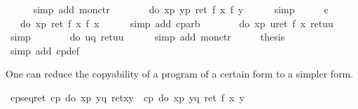 \begin{isabellebody}
\ \ \ \ \isamarkupfalse%
\ {\isacharparenleft}simp\ add{\isacharcolon}\ mon{\isacharunderscore}ctr{\isacharparenright}\isanewline
\ \ \isamarkupfalse%
\ \isamarkupfalse%
\ {\isachardoublequote}{\isasymdots}\ {\isacharequal}\ do\ {\isacharbraceleft}x{\isasymleftarrow}p{\isacharsemicolon}\ y{\isasymleftarrow}p{\isacharsemicolon}\ ret\ {\isacharparenleft}f\ x{\isacharcomma}\ f\ y{\isacharparenright}{\isacharbraceright}{\isachardoublequote}\isanewline
\ \ \ \ \isamarkupfalse%
\ simp\isanewline
\ \ \isamarkupfalse%
\ \isamarkupfalse%
\ c\ \ \isamarkupfalse%
\ {\isachardoublequote}{\isasymdots}\ {\isacharequal}\ do\ {\isacharbraceleft}x{\isasymleftarrow}p{\isacharsemicolon}\ ret\ {\isacharparenleft}f\ x{\isacharcomma}\ f\ x{\isacharparenright}{\isacharbraceright}{\isachardoublequote}\isanewline
\ \ \ \ \isamarkupfalse%
\ {\isacharparenleft}simp\ add{\isacharcolon}\ cp{\isacharunderscore}arb{\isacharparenright}\isanewline
\ \ \isamarkupfalse%
\ \isamarkupfalse%
\ {\isachardoublequote}{\isasymdots}\ {\isacharequal}\ do\ {\isacharbraceleft}x{\isasymleftarrow}p{\isacharsemicolon}\ u{\isasymleftarrow}ret\ {\isacharparenleft}f\ x{\isacharparenright}{\isacharsemicolon}\ ret{\isacharparenleft}u{\isacharcomma}u{\isacharparenright}{\isacharbraceright}{\isachardoublequote}\isanewline
\ \ \ \ \isamarkupfalse%
\ simp\isanewline
\ \ \isamarkupfalse%
\ \isamarkupfalse%
\ {\isachardoublequote}{\isasymdots}\ {\isacharequal}\ do\ {\isacharbraceleft}u{\isasymleftarrow}{\isacharquery}q{\isacharsemicolon}\ ret{\isacharparenleft}u{\isacharcomma}u{\isacharparenright}{\isacharbraceright}{\isachardoublequote}\isanewline
\ \ \ \ \isamarkupfalse%
\ {\isacharparenleft}simp\ add{\isacharcolon}\ mon{\isacharunderscore}ctr{\isacharparenright}\isanewline
\ \ \isamarkupfalse%
\ \isamarkupfalse%
\ {\isacharquery}thesis\ \isamarkupfalse%
\ {\isacharparenleft}simp\ add{\isacharcolon}\ cp{\isacharunderscore}def{\isacharparenright}\isanewline
\isamarkupfalse%
\isamarkupfalse%
%
\begin{isamarkuptext}%
One can reduce the copyability of a program of a certain form to a simpler
  form.%
\end{isamarkuptext}%
\isamarkuptrue%
\ cp{\isacharunderscore}seq{\isacharunderscore}ret{\isacharcolon}\ {\isachardoublequote}cp\ {\isacharparenleft}do\ {\isacharbraceleft}x{\isasymleftarrow}p{\isacharsemicolon}\ y{\isasymleftarrow}q{\isacharsemicolon}\ ret{\isacharparenleft}x{\isacharcomma}y{\isacharparenright}{\isacharbraceright}{\isacharparenright}\ {\isasymLongrightarrow}\ cp\ {\isacharparenleft}do\ {\isacharbraceleft}x{\isasymleftarrow}p{\isacharsemicolon}\ y{\isasymleftarrow}q{\isacharsemicolon}\ ret\ {\isacharparenleft}f\ x\ y{\isacharparenright}{\isacharbraceright}{\isacharparenright}{\isachardoublequote}\isanewline

\end{isabellebody}
